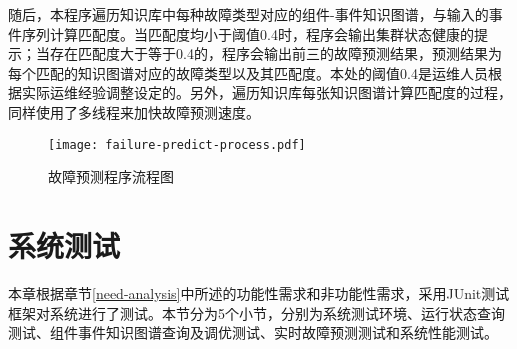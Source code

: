 随后，本程序遍历知识库中每种故障类型对应的组件-事件知识图谱，与输入的事件序列计算匹配度。当匹配度均小于阈值0.4时，程序会输出集群状态健康的提示；当存在匹配度大于等于0.4的，程序会输出前三的故障预测结果，预测结果为每个匹配的知识图谱对应的故障类型以及其匹配度。本处的阈值0.4是运维人员根据实际运维经验调整设定的。另外，遍历知识库每张知识图谱计算匹配度的过程，同样使用了多线程来加快故障预测速度。
\begin{figure}[htbp]
    \centering
    \texttt{[image: failure-predict-process.pdf]}
    \caption{故障预测程序流程图\label{failure-predict-process}}
\end{figure}

\section{系统测试}
本章根据章节\ref{need-analysis}中所述的功能性需求和非功能性需求，采用JUnit测试框架对系统进行了测试。本节分为5个小节，分别为系统测试环境、运行状态查询测试、组件事件知识图谱查询及调优测试、实时故障预测测试和系统性能测试。
